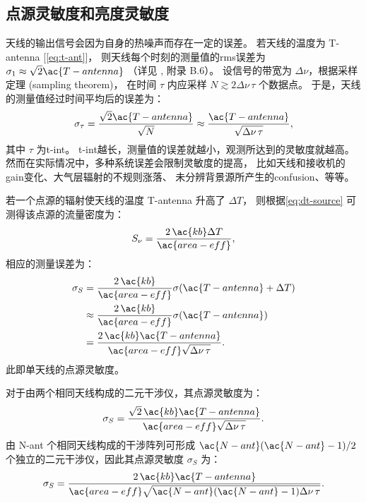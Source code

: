 %

\subsection{点源灵敏度和亮度灵敏度}

天线的输出信号会因为自身的热噪声而存在一定的误差。
若天线的温度为 \ac{T-antenna} [\autoref{eq:t-ant}]，
则天线每个时刻的测量值的\ac{rms}误差为
$\sigma_1 \approx \sqrt{2} \ac{T-antenna}$
（详见 , 附录 B.6）。
设信号的带宽为 $\Delta\nu$，根据采样定理 (sampling theorem)，
在时间 $\tau$ 内应采样 $N \gtrsim 2 \Delta\nu \,\tau$ 个数据点。
于是，天线的测量值经过时间平均后的误差为：
\begin{equation}
  \label{eq:radiometer}
  \sigma_{\tau}
    = \frac{\sqrt{2} \ac{T-antenna}}{\sqrt{N}}
    \approx \frac{\ac{T-antenna}}{\sqrt{\Delta\nu \,\tau}} ,
\end{equation}
其中 $\tau$ 为\ac{t-int}。
\ac{t-int}越长，测量值的误差就越小，观测所达到的灵敏度就越高。
然而在实际情况中，多种系统误差会限制灵敏度的提高，
比如天线和接收机的\ac{gain}变化、大气层辐射的不规则涨落、
未分辨背景源所产生的\ac{confusion}、等等。

若一个点源的辐射使天线的温度 \ac{T-antenna} 升高了 $\Delta T$，
则根据\autoref{eq:dt-source} 可测得该点源的流量密度为：
\begin{equation}
  S_{\nu} = \frac{2\,\ac{kb} \Delta T}{\ac{area-eff}} ,
\end{equation}
相应的测量误差为：
\begin{align}
  \sigma_S
    & = \frac{2\,\ac{kb}}{\ac{area-eff}} \sigma(\ac{T-antenna} + \Delta T) \\
    & \approx \frac{2\,\ac{kb}}{\ac{area-eff}} \sigma(\ac{T-antenna}) \\
    & = \frac{2\,\ac{kb} \ac{T-antenna}}{
      \ac{area-eff} \sqrt{\Delta\nu \,\tau}} .
\end{align}
此即单天线的点源灵敏度。

对于由两个相同天线构成的二元干涉仪，其点源灵敏度为：
\begin{equation}
  \sigma_S
    = \frac{\sqrt{2}\,\ac{kb} \ac{T-antenna}}{
        \ac{area-eff} \sqrt{\Delta\nu \,\tau}} .
\end{equation}
由 \ac{N-ant} 个相同天线构成的干涉阵列可形成 $\ac{N-ant}(\ac{N-ant}-1)/2$
个独立的二元干涉仪，因此其点源灵敏度 $\sigma_S$ 为：
\begin{equation}
  \label{eq:sigma-ps}
  \sigma_S
    = \frac{2\,\ac{kb} \ac{T-antenna}}{
        \ac{area-eff} \sqrt{\ac{N-ant}(\ac{N-ant}-1) \Delta\nu \,\tau}} .
\end{equation}

